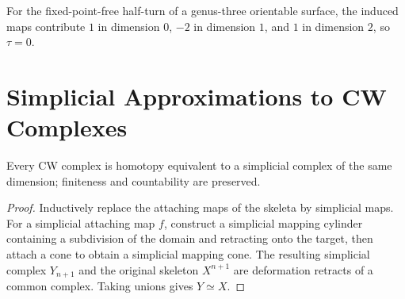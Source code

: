 \begin{example}
\label{ex:lefschetz-surface-rotation}

For the fixed-point-free half-turn of a genus-three orientable surface, the induced maps contribute $1$ in dimension $0$, $-2$ in dimension $1$, and $1$ in dimension $2$, so $\tau=0$.
\end{example}

\section{Simplicial Approximations to CW Complexes}

\begin{theorem}
\label{thm:cw-homotopy-equivalent-simplicial}

Every CW complex is homotopy equivalent to a simplicial complex of the same dimension; finiteness and countability are preserved.
\end{theorem}
\begin{proof}
\sketch Inductively replace the attaching maps of the skeleta by simplicial maps.  For a simplicial attaching map $f$, construct a simplicial mapping cylinder containing a subdivision of the domain and retracting onto the target, then attach a cone to obtain a simplicial mapping cone.  The resulting simplicial complex $Y_{n+1}$ and the original skeleton $X^{n+1}$ are deformation retracts of a common complex.  Taking unions gives $Y\simeq X$.
\end{proof}
